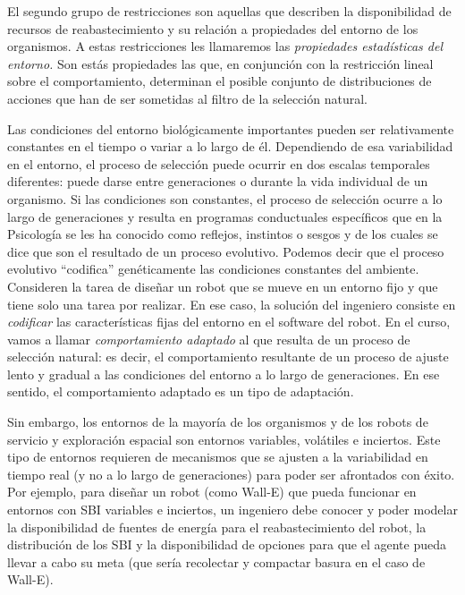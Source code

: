 \documentclass[
  a4paper,
  DIV=11,
  numbers=noendperiod]{scrreprt}
\begin{document}
El segundo grupo de restricciones son aquellas que describen la
disponibilidad de recursos de reabastecimiento y su relación a
propiedades del entorno de los organismos. A estas restricciones les
llamaremos las \emph{propiedades estadísticas del entorno.} Son estás
propiedades las que, en conjunción con la restricción lineal sobre el
comportamiento, determinan el posible conjunto de distribuciones de
acciones que han de ser sometidas al filtro de la selección natural.

Las condiciones del entorno biológicamente importantes pueden ser
relativamente constantes en el tiempo o variar a lo largo de él.
Dependiendo de esa variabilidad en el entorno, el proceso de selección
puede ocurrir en dos escalas temporales diferentes: puede darse entre
generaciones o durante la vida individual de un organismo. Si las
condiciones son constantes, el proceso de selección ocurre a lo largo de
generaciones y resulta en programas conductuales específicos que en la
Psicología se les ha conocido como reflejos, instintos o sesgos y de los
cuales se dice que son el resultado de un proceso evolutivo. Podemos
decir que el proceso evolutivo ``codifica'' genéticamente las
condiciones constantes del ambiente. Consideren la tarea de diseñar un
robot que se mueve en un entorno fijo y que tiene solo una tarea por
realizar. En ese caso, la solución del ingeniero consiste en
\emph{codificar} las características fijas del entorno en el software
del robot. En el curso, vamos a llamar \emph{comportamiento adaptado} al
que resulta de un proceso de selección natural: es decir, el
comportamiento resultante de un proceso de ajuste lento y gradual a las
condiciones del entorno a lo largo de generaciones. En ese sentido, el
comportamiento adaptado es un tipo de adaptación.

Sin embargo, los entornos de la mayoría de los organismos y de los
robots de servicio y exploración espacial son entornos variables,
volátiles e inciertos. Este tipo de entornos requieren de mecanismos que
se ajusten a la variabilidad en tiempo real (y no a lo largo de
generaciones) para poder ser afrontados con éxito. Por ejemplo, para
diseñar un robot (como Wall-E) que pueda funcionar en entornos con SBI
variables e inciertos, un ingeniero debe conocer y poder modelar la
disponibilidad de fuentes de energía para el reabastecimiento del robot,
la distribución de los SBI y la disponibilidad de opciones para que el
agente pueda llevar a cabo su meta (que sería recolectar y compactar
basura en el caso de Wall-E).
\end{document}
